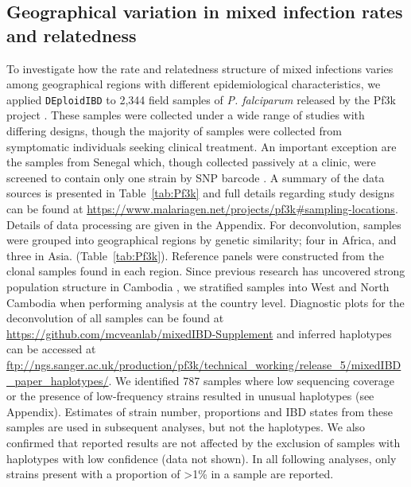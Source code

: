 \documentclass[9pt,lineno]{elife}
\begin{document}
\subsection{Geographical variation in mixed infection rates and relatedness}

To investigate how the rate and relatedness structure of mixed infections varies among geographical regions with different epidemiological characteristics, we applied \texttt{DEploidIBD} to 2,344 field samples of {\it P. falciparum} released by the Pf3k project \citep{pf3k}.  These samples were collected under a wide range of studies with differing designs, though the majority of samples were collected from symptomatic individuals seeking clinical treatment. An important exception are the samples from Senegal which, though collected passively at a clinic, were screened to contain only one strain by SNP barcode \citep{Daniels2015}.  A summary of the data sources is presented in Table~\ref{tab:Pf3k} and full details regarding study designs can be found at \url{https://www.malariagen.net/projects/pf3k#sampling-locations}. Details of data processing are given in the Appendix. For deconvolution, samples were grouped into geographical regions by genetic similarity; four in Africa, and three in Asia. (Table~\ref{tab:Pf3k}). Reference panels were constructed from the clonal samples found in each region. Since previous research has uncovered strong population structure in Cambodia \citep{Miotto2013}, we stratified samples into West and North Cambodia when performing analysis at the country level. Diagnostic plots for the deconvolution of all samples can be found at \url{https://github.com/mcveanlab/mixedIBD-Supplement} and inferred haplotypes can be accessed at \url{ftp://ngs.sanger.ac.uk/production/pf3k/technical_working/release_5/mixedIBD_paper_haplotypes/}. We identified 787 samples where low sequencing coverage or the presence of low-frequency strains resulted in unusual haplotypes (see Appendix). Estimates of strain number, proportions and IBD states from these samples are used in subsequent analyses, but not the haplotypes. We also confirmed that reported results are not affected by the exclusion of samples with haplotypes with low confidence (data not shown).  In all following analyses, only strains present with a proportion of >1\% in a sample are reported.
\end{document}
